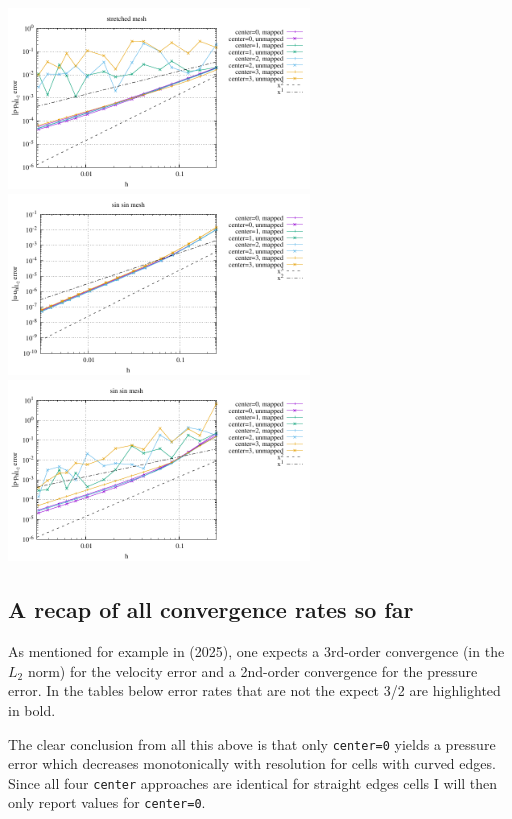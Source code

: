 \begin{center}
\includegraphics[width=8cm]{python_codes/fieldstone_76/results/bench9/curved/errors_P_mt4.pdf}\\
\includegraphics[width=8cm]{python_codes/fieldstone_76/results/bench9/curved/errors_V_mt5.pdf}
\includegraphics[width=8cm]{python_codes/fieldstone_76/results/bench9/curved/errors_P_mt5.pdf}
\end{center}

\newpage
\subsection*{A recap of all convergence rates so far}


As mentioned for example in \textcite{thba25} (2025), 
one expects a 3rd-order convergence (in the $L_2$ norm) for the velocity
error and a 2nd-order convergence for the pressure error.
In the tables below error rates that are not the expect 3/2 are highlighted in bold.

The clear conclusion from all this above is that only \lstinline{center=0}
yields a pressure error which decreases monotonically with resolution 
for cells with curved edges. 
Since all four \lstinline{center} approaches are identical for straight edges
cells I will then only report values for \lstinline{center=0}. 


